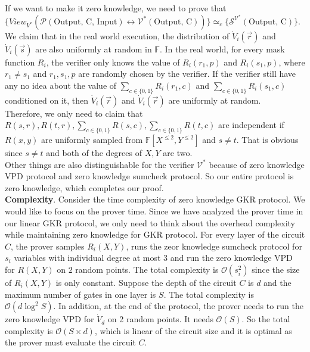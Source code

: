 If we want to make it zero knowledge, we need to prove that $\{View_{V^*}(\mathcal{P}(\text{Output, C, Input}) \leftrightarrow \mathcal{V^*}(\text{Output, C}))\} \simeq_{c} \{\mathcal{S}^{\mathcal{V^*}}(\text{Output, C})\}$. We claim that in the real world execution, the distribution of $\dot{V}_i(\vec{r})$ and $\dot{V}_i(\vec{s})$ are also uniformly at random in $\mathbb{F}$. In the real world, for every mask function $R_i$, the verifier only knows the value of $R_i(r_1, p)$ and $R_i(s_1, p)$, where $r_1 \neq s_1$ and $r_1, s_1, p$ are randomly chosen by the verifier. If the verifier still have any no idea about the value of $\sum\limits_{c \in \{0, 1\}}R_i(r_1, c)$ and $\sum\limits_{c \in \{0, 1\}}R_i(s_1, c)$ conditioned on it, then $\dot{V}_i(\vec{r})$ and $\dot{V}_i(\vec{r})$ are uniformly at random.\\

Therefore, we only need to claim that $R(s, r), R(t, r), \sum\limits_{c \in \{0, 1\}}R(s, c), \sum\limits_{c \in \{0, 1\}}R(t, c)$ are independent if $R(x, y)$ are uniformly sampled from $\mathbb{F}[X^{\leqslant 2}, Y^{\leqslant 2}]$ and $s \neq t$. That is obvious since $s \neq t$ and both of the degrees of $X, Y$ are two. \\

Other things are also distinguishable for the verifier $\mathcal{V^*}$ because of zero knowledge VPD protocol and zero knowledge sumcheck protocol. So our entire protocol is zero knowledge, which completes our proof.\\

\noindent
\textbf{Complexity}. Consider the time complexity of zero knowledge GKR protocol. We would like to focus on the prover time. Since we have analyzed the prover time in our linear GKR protocol, we only need to think about the overhead complexity while maintaining zero knowledge for GKR protocol. For every layer of the circuit $C$, the prover samples $R_i(X, Y)$, runs the zeor knowledge sumcheck protocol for $s_i$ variables with individual degree at most $3$ and run the zero knowledge VPD for $R(X, Y)$ on $2$ random points. The total complexity is $\mathcal{O}(s_i^2)$ since the size of $R_i(X, Y)$ is only constant. Suppose the depth of the circuit $C$ is $d$ and the maximum number of gates in one layer is $S$. The total complexity is $\mathcal{O}(d \log^2 S)$. In addition, at the end of the protocol, the prover needs to run the zero knowledge VPD for $\dot{V}_d$ on 2 random points. It needs $\mathcal{O}(S)$. So the total complexity is $\mathcal{O}(S \times d)$, which is linear of the circuit size and it is optimal as the prover must evaluate the circuit $C$. 


















